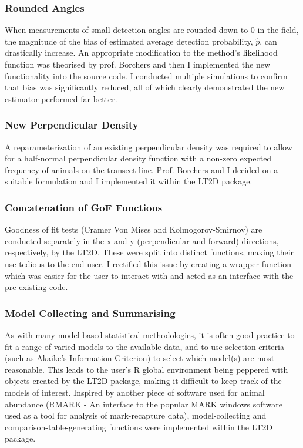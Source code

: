\documentclass[11pt]{article}
\begin{document}
\begin{multicols}{2}
\subsubsection{Rounded Angles}
When measurements of small detection angles are rounded down to $0$ in the field, the magnitude of the bias of estimated average detection probability, $\hat{p}$, can drastically increase. An appropriate modification to the method's likelihood function was theorised by prof. Borchers and then I implemented the new functionality into the source code. I conducted multiple simulations to confirm that bias was significantly reduced, all of which clearly demonstrated the new estimator performed far better.

\subsubsection{New Perpendicular Density}
A reparameterization of an existing perpendicular density was required to allow for a  half-normal perpendicular density function with a non-zero expected frequency of animals on the transect line. Prof. Borchers and I decided on a suitable formulation and I implemented it within the LT2D package. 

\subsubsection{Concatenation of GoF Functions}
Goodness of fit tests (Cramer Von Mises and Kolmogorov-Smirnov) are conducted separately in the x and y (perpendicular and forward) directions, respectively, by the LT2D. These were split into distinct functions, making their use tedious to the end user. I rectified this issue by creating a wrapper function which was easier for the user to interact with and acted as an interface with the pre-existing code.

\subsubsection{Model Collecting and Summarising}
As with many model-based statistical methodologies, it is often good practice to fit a range of varied models to the available data, and to use selection criteria (such as Akaike's Information Criterion) to select which model(s) are most reasonable. This leads to the user's R global environment being peppered with objects created by the LT2D package, making it difficult to keep track of the models of interest. Inspired by another piece of software used for animal abundance (RMARK - An interface to the popular MARK windows software used as a tool for analysis of mark-recapture data), model-collecting and comparison-table-generating functions were implemented within the LT2D package.


\end{multicols}
\end{document}
